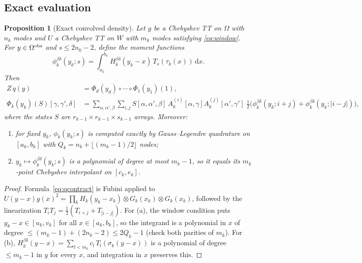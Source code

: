\documentclass[11pt]{article}
\newtheorem{proposition}{Proposition}
\theoremstyle{definition}
\theoremstyle{remark}
\newcommand{\dd}{\,\mathrm{d}}
\begin{document}
\subsection{Exact evaluation}
\begin{proposition}[Exact convolved density]\label{prop:exact}
Let $g$ be a Chebyshev TT on $\Omega$ with $n_k$ modes and $U$ a Chebyshev TT on $W$ with $m_k$ modes satisfying
\eqref{eq:window}. For $y\in\Omega^{\rm obs}$ and $s\le 2n_k-2$, define the \emph{moment functions}
\[
  \phi_k^{\beta\delta}(y_k;s)=\int_{a_k}^{b_k}H_k^{\beta\delta}(y_k-x)\,T_s(\tau_k(x))\dd x .
\]
Then
\begin{equation}\label{eq:qcontract}
\begin{aligned}
  Z\,q(y)&=\Phi_d(y_d)\circ\cdots\circ\Phi_1(y_1)(1),\\
  \Phi_k(y_k)(S)[\gamma,\gamma',\delta]&=\sum_{\alpha,\alpha',\beta}\sum_{i,j}S[\alpha,\alpha',\beta]\,
  A_k^{(i)}[\alpha,\gamma]A_k^{(j)}[\alpha',\gamma']\;
  \tfrac12\bigl(\phi_k^{\beta\delta}(y_k;i{+}j)+\phi_k^{\beta\delta}(y_k;|i{-}j|)\bigr),
\end{aligned}
\end{equation}
where the states $S$ are $r_{k-1}\times r_{k-1}\times s_{k-1}$ arrays. Moreover:
\begin{enumerate}[label=(\alph*),itemsep=1pt]
\item for fixed $y_k$, $\phi_k(y_k;s)$ is computed exactly by Gauss--Legendre quadrature on $[a_k,b_k]$ with
$Q_k=n_k+\lfloor (m_k-1)/2\rfloor$ nodes;
\item $y_k\mapsto\phi_k^{\beta\delta}(y_k;s)$ is a polynomial of degree at most $m_k-1$, so it equals its
$m_k$-point Chebyshev interpolant on $[c_k,e_k]$.
\end{enumerate}
\end{proposition}
\begin{proof}
Formula~\eqref{eq:qcontract} is Fubini applied to $U(y-x)g(x)^2=\prod_k H_k(y_k-x_k)\otimes G_k(x_k)\otimes G_k(x_k)$,
followed by the linearization $T_iT_j=\frac12(T_{i+j}+T_{|i-j|})$. For (a), the window condition puts
$y_k-x\in[u_k,v_k]$ for all $x\in[a_k,b_k]$, so the integrand is a polynomial in $x$ of degree
$\le (m_k-1)+(2n_k-2)\le 2Q_k-1$ (check both parities of $m_k$). For (b), $H_k^{\beta\delta}(y-x)=\sum_{l<m_k}c_l\,T_l(\sigma_k(y-x))$ is a polynomial of
degree $\le m_k-1$ in $y$ for every $x$, and integration in $x$ preserves this.
\end{proof}
\end{document}
